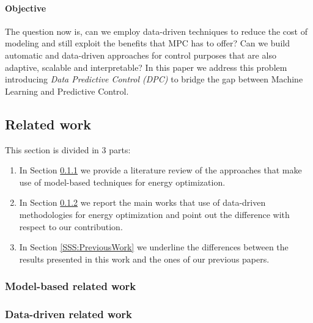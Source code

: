 \paragraph{Objective} The question now is, can we employ data-driven techniques to reduce the cost of modeling and still exploit the benefits that MPC has to offer? Can we build automatic and data-driven approaches for control purposes that are also adaptive, scalable and interpretable? In this paper we address this problem introducing \textit{Data Predictive Control (DPC)} to bridge the gap between Machine Learning and Predictive Control.
\textcolor[rgb]{0,0,1}{
\subsection{Related work}
This section is divided in 3 parts:
\begin{enumerate}
	\item In Section \ref{SSS:ModelBasedWork} we provide a literature review of the approaches that make use of model-based techniques for energy optimization.
	\item In Section \ref{SSS:DataDrivenWork} we report the main works that use of data-driven methodologies for energy optimization and point out the difference with respect to our contribution.
	\item In Section \ref{SSS:PreviousWork} we underline the differences between the results presented in this work and the ones of our previous papers.
\end{enumerate}
\subsubsection{Model-based related work}\label{SSS:ModelBasedWork}
\subsubsection{Data-driven related work}\label{SSS:DataDrivenWork}}
